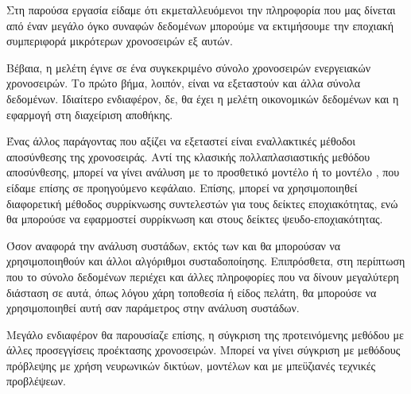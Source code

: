 Στη παρούσα εργασία είδαμε ότι εκμεταλλευόμενοι την πληροφορία που μας δίνεται από έναν μεγάλο όγκο συναφών δεδομένων μπορούμε να εκτιμήσουμε την εποχιακή συμπεριφορά μικρότερων χρονοσειρών εξ αυτών.

Βέβαια, η μελέτη έγινε σε ένα συγκεκριμένο σύνολο χρονοσειρών ενεργειακών χρονοσειρών. Το πρώτο βήμα, λοιπόν, είναι να εξεταστούν και άλλα σύνολα δεδομένων. Ιδιαίτερο ενδιαφέρον, δε, θα έχει η μελέτη οικονομικών δεδομένων και η εφαρμογή στη διαχείριση αποθήκης.

Ένας άλλος παράγοντας που αξίζει να εξεταστεί είναι εναλλακτικές μέθοδοι αποσύνθεσης της χρονοσειράς. Αντί της κλασικής πολλαπλασιαστικής μεθόδου αποσύνθεσης, μπορεί να γίνει ανάλυση με το προσθετικό μοντέλο ή το μοντέλο , που είδαμε επίσης σε προηγούμενο κεφάλαιο. Επίσης, μπορεί να χρησιμοποιηθεί διαφορετική μέθοδος συρρίκνωσης συντελεστών για τους δείκτες εποχιακότητας, ενώ θα μπορούσε να εφαρμοστεί συρρίκνωση και στους δείκτες ψευδο-εποχιακότητας.

Όσον αναφορά την ανάλυση συστάδων, εκτός των  και  θα μπορούσαν να χρησιμοποιηθούν και άλλοι αλγόριθμοι συσταδοποίησης. Επιπρόσθετα, στη περίπτωση που το σύνολο δεδομένων περιέχει και άλλες πληροφορίες που να δίνουν μεγαλύτερη διάσταση σε αυτά, όπως λόγου χάρη τοποθεσία ή είδος πελάτη, θα μπορούσε να χρησιμοποιηθεί αυτή σαν παράμετρος στην ανάλυση συστάδων.

Μεγάλο ενδιαφέρον θα παρουσίαζε επίσης, η σύγκριση της προτεινόμενης μεθόδου με άλλες προσεγγίσεις προέκτασης χρονοσειρών. Μπορεί να γίνει σύγκριση με μεθόδους πρόβλεψης με χρήση νευρωνικών δικτύων, μοντέλων  και με μπεϋζιανές τεχνικές προβλέψεων. 
